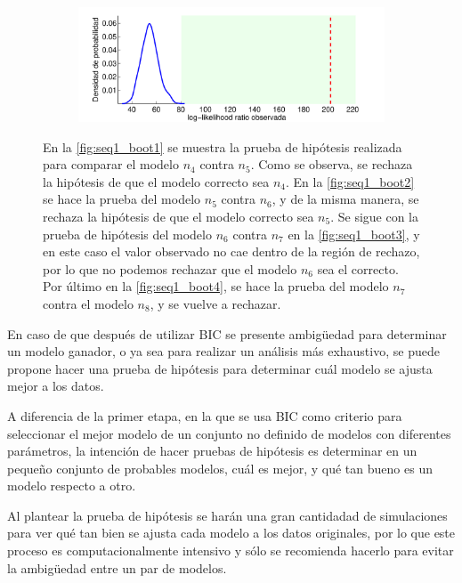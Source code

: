 \begin{figure}[t!]
{\begin{subfigure}[b]{0.7\textwidth}
      \caption{}
      \label{fig:seq1_boot3}
    \end{subfigure}
    \hspace{-0.5cm}
    \begin{subfigure}[b]{0.7\textwidth}
      \includegraphics[width=1\linewidth]{gfx/chap6/cuervoboot4}
      \caption{}
      \label{fig:seq1_boot4}
    \end{subfigure}
  }
  \caption[Secuencia 1: Pruebas de hipótesis usando bootstrap]{En la \autoref{fig:seq1_boot1} se muestra la prueba de hipótesis realizada para comparar el modelo $n_4$ contra $n_5$. Como se observa, se rechaza la hipótesis de que el modelo correcto sea $n_4$. En la \autoref{fig:seq1_boot2} se hace la prueba del modelo $n_5$ contra $n_6$, y de la misma manera, se rechaza la hipótesis de que el modelo correcto sea $n_5$. Se sigue con la prueba de hipótesis del modelo $n_6$ contra $n_7$ en la \autoref{fig:seq1_boot3}, y en este caso el valor observado no cae dentro de la región de rechazo, por lo que no podemos rechazar que el modelo $n_6$ sea el correcto. Por último en la \autoref{fig:seq1_boot4}, se hace la prueba del modelo $n_7$ contra el modelo $n_8$, y se vuelve a rechazar.}
  \label{fig:seq1_boot}
\end{figure}

En caso de que después de utilizar BIC se presente ambigüedad para determinar un modelo ganador, o ya sea para realizar un análisis más exhaustivo, se puede propone hacer una prueba de hipótesis para determinar cuál modelo se ajusta mejor a los datos.

A diferencia de la primer etapa, en la que se usa BIC como criterio para  seleccionar el mejor modelo de un conjunto no definido de modelos con diferentes parámetros, la intención de hacer pruebas de hipótesis es determinar en un pequeño conjunto de probables modelos, cuál es mejor, y qué tan bueno es un modelo respecto a otro.

Al plantear la prueba de hipótesis se harán una gran cantidadad de simulaciones para ver qué tan bien se ajusta cada modelo a los datos originales, por lo que este proceso es computacionalmente intensivo y sólo se recomienda hacerlo para evitar la ambigüedad entre un par de modelos.

